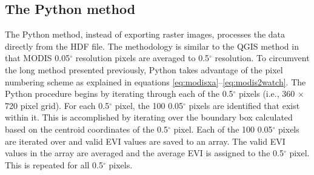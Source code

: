 \subsection{The Python method}
\label{app:modpy}
The Python method, instead of exporting raster images, processes the data directly from the HDF file.  
The methodology is similar to the QGIS method in that MODIS 0.05$^{\circ}$ resolution pixels are averaged to 0.5$^{\circ}$ resolution.  
To circumvent the long method presented previously, Python takes advantage of the pixel numbering scheme as explained in equations \ref{eq:modisxa}--\ref{eq:modis2watch}.  
The Python procedure begins by iterating through each of the 0.5$^{\circ}$ pixels (i.e., 360 $\times$ 720 pixel grid).  
For each 0.5$^{\circ}$ pixel, the 100 0.05$^{\circ}$ pixels are identified that exist within it.  
This is accomplished by iterating over the boundary box calculated based on the centroid coordinates of the 0.5$^{\circ}$ pixel.  
Each of the 100 0.05$^{\circ}$ pixels are iterated over and valid EVI values are saved to an array.  
The valid EVI values in the array are averaged and the average EVI is assigned to the 0.5$^{\circ}$ pixel.  
This is repeated for all 0.5$^{\circ}$ pixels. 

